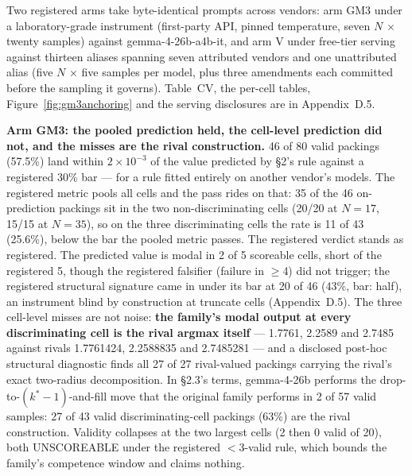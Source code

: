 Two registered arms take byte-identical prompts across vendors: arm GM3 under a laboratory-grade
instrument (first-party API, pinned temperature, seven $N$ $\times$ twenty samples) against
gemma-4-26b-a4b-it, and arm V under free-tier serving against thirteen aliases spanning seven
attributed vendors and one unattributed alias (five $N$ $\times$ five samples per model, plus three
amendments each committed before the sampling it governs). Table~CV, the per-cell tables,
Figure~\ref{fig:gm3anchoring} and the serving disclosures are in Appendix~D.5.

\textbf{Arm GM3: the pooled prediction held, the cell-level prediction did not, and the misses are
the rival construction.} 46 of 80 valid packings (57.5\%) land within $2\times10^{-3}$ of the value
predicted by \S2's rule against a registered 30\% bar --- for a rule fitted entirely on another
vendor's models. The registered metric pools all cells and the pass rides on that: 35 of the 46
on-prediction packings sit in the two non-discriminating cells (20/20 at $N = 17$, 15/15 at
$N = 35$), so on the three discriminating cells the rate is 11 of 43 (25.6\%), below the bar the
pooled metric passes. The registered verdict stands as registered. The predicted value is modal in
2 of 5 scoreable cells, short of the registered 5, though the registered falsifier (failure in
$\ge$4) did not trigger; the registered structural signature came in under its bar at 20 of 46
(43\%, bar: half), an instrument blind by construction at truncate cells (Appendix~D.5). The three
cell-level misses are not noise: \textbf{the family's modal output at every discriminating cell is
the rival argmax itself} --- 1.7761, 2.2589 and 2.7485 against rivals 1.7761424, 2.2588835 and
2.7485281 --- and a disclosed post-hoc structural diagnostic finds all 27 of 27 rival-valued
packings carrying the rival's exact two-radius decomposition. In \S2.3's terms, gemma-4-26b performs
the drop-to-$(k^*{-}1)$-and-fill move that the original family performs in 2 of 57 valid samples:
27 of 43 valid discriminating-cell packings (63\%) are the rival construction. Validity collapses
at the two largest cells (2 then 0 valid of 20), both UNSCOREABLE under the registered $<$3-valid
rule, which bounds the family's competence window and claims nothing.

